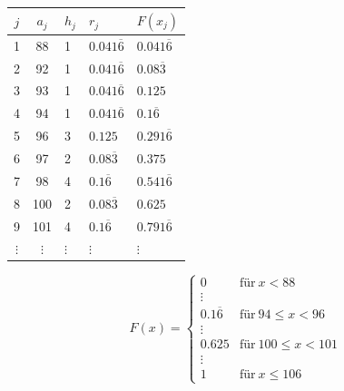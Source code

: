 \begin{table}[H]
\centering
\begin{tabular}{c|clll}
     $j$      & $a_j$ & $h_j$     & $r_j$               & $F(x_j)$ \\ \hline
     1        & 88    & 1         & $0.041\overline{6}$ & $0.041\overline{6}$ \\
     2        & 92    & 1         & $0.041\overline{6}$ & $0.08\overline{3}$  \\
     3        & 93    & 1         & $0.041\overline{6}$ & $0.125$             \\
     4        & 94    & 1         & $0.041\overline{6}$ & $0.1\overline{6}$   \\
     5        & 96    & 3         & $0.125$             & $0.291\overline{6}$ \\
     6        & 97    & 2         & $0.08\overline{3}$  & $0.375$             \\
     7        & 98    & 4         & $0.1\overline{6}$   & $0.541\overline{6}$ \\
     8        & 100   & 2         & $0.08\overline{3}$  & $0.625$             \\
     9        & 101   & 4         & $0.1\overline{6}$   & $0.791\overline{6}$ \\
     $\vdots$ & $\vdots$ & $\vdots$  & $\vdots$            & $\vdots$
\end{tabular}
\end{table}

$$
F(x) = \begin{cases}
    0      & \text{für}~x<88 \\
    \vdots & \\
    0.1\overline{6} & \text{für}~94\le x<96 \\
    \vdots & \\
    0.625  & \text{für}~100\le x<101 \\
    \vdots & \\
    1      & \text{für}~x\le 106
\end{cases}
$$

